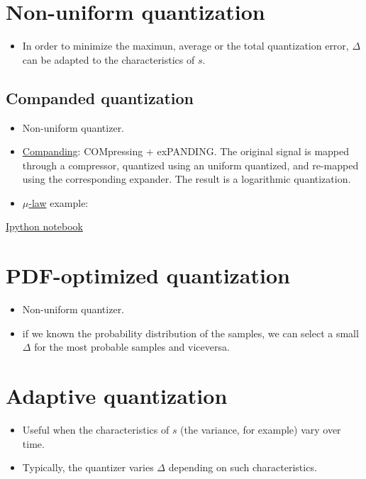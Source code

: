 \section{Non-uniform quantization}
\begin{itemize}
  \tightlist
\item
  In order to minimize the maximun, average or the total quantization
  error, \(\Delta\) can be adapted to the characteristics of \(s\).
\end{itemize}

\subsection{Companded quantization}
\begin{itemize}
\item
  Non-uniform quantizer.
\item
  \href{https://en.wikipedia.org/wiki/Companding}{Companding}:
  COMpressing + exPANDING. The original signal is mapped through a
  compressor, quantized using an uniform quantized, and re-mapped using
  the corresponding expander. The result is a logarithmic quantization.
\item
  \href{https://en.wikipedia.org/wiki/\%CE\%9C-law_algorithm}{\(\mu\)-law}
  example:
\end{itemize}

\href{https://nbviewer.jupyter.org/github/vicente-gonzalez-ruiz/quantization/blob/master/companded_quantization.ipynb}{Ipython notebook}


\section{PDF-optimized quantization}
\begin{itemize}
\item
  Non-uniform quantizer.
\item
  if we known the probability distribution of the samples, we can select
  a small \(\Delta\) for the most probable samples and viceversa.
\end{itemize}


\section{Adaptive quantization}
\begin{itemize}
\item
  Useful when the characteristics of \(s\) (the variance, for example)
  vary over time.
\item
  Typically, the quantizer varies \(\Delta\) depending on such
  characteristics.
\end{itemize}

